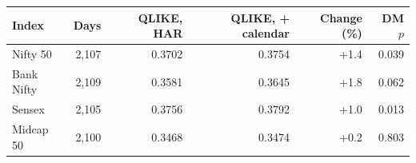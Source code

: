 \begin{tabular}{lrrrrr}
\toprule
Index & Days & QLIKE, HAR & QLIKE, + calendar & Change (\%) & DM $p$ \\
\midrule
Nifty 50 & 2,107 & 0.3702 & 0.3754 & +1.4 & 0.039 \\
Bank Nifty & 2,109 & 0.3581 & 0.3645 & +1.8 & 0.062 \\
Sensex & 2,105 & 0.3756 & 0.3792 & +1.0 & 0.013 \\
Midcap 50 & 2,100 & 0.3468 & 0.3474 & +0.2 & 0.803 \\
\bottomrule
\end{tabular}